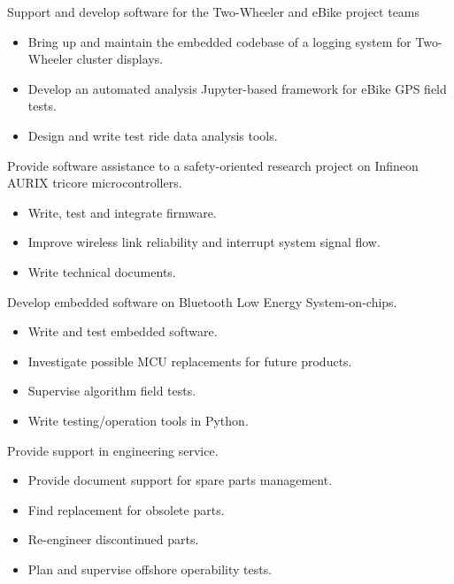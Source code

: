 \documentclass[11pt,a4paper,sans]{moderncv}        %
\begin{document}
{
Support and develop software for the Two-Wheeler and eBike project teams
\begin{itemize}%
    \item Bring up and maintain the embedded codebase of a logging system for Two-Wheeler cluster displays. 
    \item Develop an automated analysis Jupyter-based framework for eBike GPS field tests.
    \item Design and write test ride data analysis tools.
\end{itemize}
}

{
Provide software assistance to a safety-oriented research project on Infineon AURIX tricore microcontrollers.
\begin{itemize}%
    \item Write, test and integrate firmware.
    \item Improve wireless link reliability and interrupt system signal flow.
    \item Write technical documents.
\end{itemize}
}

{
Develop embedded software on Bluetooth Low Energy System-on-chips.
\begin{itemize}%
    \item Write and test embedded software.
    \item Investigate possible MCU replacements for future products.
    \item Supervise algorithm field tests.
    \item Write testing/operation tools in Python.
\end{itemize}
}

{
Provide support in engineering service.
\begin{itemize}%
    \item Provide document support for spare parts management.
    \item Find replacement for obsolete parts.
    \item Re-engineer discontinued parts.
    \item Plan and supervise offshore operability tests.
\end{itemize}
}
\end{document}
